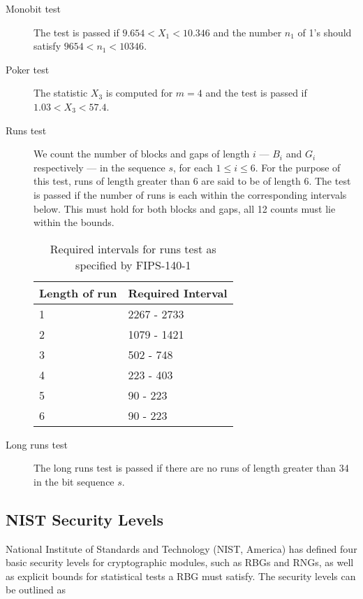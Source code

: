 \documentclass[a4paper]{article}           %
\begin{document}
\begin{description}
\item[Monobit test] The test is passed if $9.654 < X_1 < 10.346$ and the number $n_1$ of 1's should satisfy $9654 < n_1 < 10346$.
\item[Poker test] The statistic $X_3$ is computed for $m=4$ and the test is passed if $1.03 < X_3 < 57.4$. 
\item [Runs test] We count the number of blocks and gaps of length $i$ --- $B_i$ and $G_i$ respectively --- in the sequence $s$, for each $1 \leq i \leq 6$. For the purpose of this test, runs of length greater than 6 are said to be of length 6\cite{fips140}. The test is passed if the number of runs is each within the corresponding intervals below. This must hold for both blocks and gaps, all 12 counts must lie within the bounds. 

  \begin{table}[h!]
    \begin{center}
      \begin{tabular}{| l | l |}
        \hline
        Length of run & Required Interval \\
        \hline
        \hline
        1 & 2267 - 2733 \\
        2 & 1079 - 1421 \\
        3 & 502 - 748 \\
        4 & 223 - 403 \\
        5 & 90 - 223 \\
        6 & 90 - 223 \\
        \hline
      \end{tabular}
    \end{center}
    \caption{Required intervals for runs test as specified by FIPS-140-1}
  \end{table}

\item[Long runs test] The long runs test is passed if there are no runs of length greater than 34 in the bit sequence $s$. 
\end{description}

\subsection{NIST Security Levels}

National Institute of Standards and Technology (NIST, America) has defined\cite{fips140} four basic security levels for cryptographic modules, such as RBGs and RNGs, as well as explicit bounds for statistical tests a RBG must satisfy. The security levels can be outlined as
\end{document}
